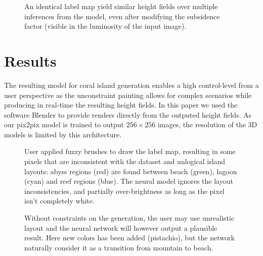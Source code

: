 \begin{figure}[t]
    \caption{An identical label map yield similar height fields over multiple inferences from the model, even after modifying the subsidence factor (visible in the luminosity of the input image).}
    \label{fig:coral-island_results-subsidence}
\end{figure}
\section{Results}
\label{sec:coral-island_results}

The resulting model for coral island generation enables a high control-level from a user perspective as the unconstraint painting allows for complex scenarios while producing in real-time the resulting height fields. In this paper we used the software Blender to provide renders directly from the outputed height fields. As our pix2pix model is trained to output $256\times256$ images, the resolution of the 3D models is limited by this architecture.

\begin{figure}[t]
    \caption{User applied fuzzy brushes to draw the label map, resulting in some pixels that are inconsistent with the dataset and unlogical island layouts: abyss regions (red) are found between beach (green), lagoon (cyan) and reef regions (blue). The neural model ignores the layout inconsistencies, and partially over-brightness as long as the pixel isn't completely white. }
    \label{fig:coral-island_results-fuzzy}
\end{figure}
\begin{figure}[b]
    \caption{Without constraints on the generation, the user may use unrealistic layout and the neural network will however output a plausible result. Here new colors has been added (pistachio), but the network naturally consider it as a transition from mountain to beach. }
    \label{fig:coral-island_results_dino}
\end{figure}

